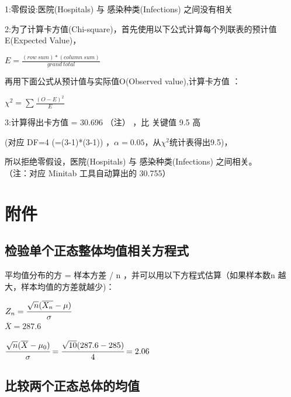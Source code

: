 1:零假设:医院(Hospitals) 与 感染种类(Infections) 之间没有相关

2:为了计算卡方值(Chi-square)，首先使用以下公式计算每个列联表的预计值E(Expected
Value)，

\(E = \frac{(row \ sum) * (column \ sum)} {grand \ total}\)

再用下面公式从预计值与实际值O(Observed value),计算卡方值 ：

\(\chi ^2 = \sum \frac{(O - E)^2} {E}\)

3:计算得出卡方值 = 30.696 （注） ，比 关键值 9.5 高

\begin{description}
\tightlist
\item[]
(对应 DF=4 (=(3-1)*(3-1))
，\(\alpha = 0.05\)，从\(\chi ^2\)统计表得出9.5)，\\
\end{description}

所以拒绝零假设，医院(Hospitals) 与 感染种类(Infections) 之间相关。\\

（注：对应 Minitab 工具自动算出的 30.755）\\

\hypertarget{ux9644ux4ef6}{%
\section{附件}\label{ux9644ux4ef6}}

\hypertarget{ux68c0ux9a8cux5355ux4e2aux6b63ux6001ux6574ux4f53ux5747ux503cux76f8ux5173ux65b9ux7a0bux5f0f}{%
\subsection{检验单个正态整体均值相关方程式}\label{ux68c0ux9a8cux5355ux4e2aux6b63ux6001ux6574ux4f53ux5747ux503cux76f8ux5173ux65b9ux7a0bux5f0f}}

平均值分布的方 = 样本方差 / n ，并可以用以下方程式估算（如果样本数n
越大，样本均值的方差就越少)：

\(Z_n = \cfrac{ \sqrt{n}(\overline{X_n} - \mu) }{\sigma}\)\\

\(\overline{X} = 287.6\)

\(\cfrac{ \sqrt{n}(\overline{X} - \mu_0) }{\sigma} = \cfrac{ \sqrt{10}( 287.6 - 285 ) }{4} = 2.06\)\\

\hypertarget{ux6bd4ux8f83ux4e24ux4e2aux6b63ux6001ux603bux4f53ux7684ux5747ux503c-1}{%
\subsection{比较两个正态总体的均值}\label{ux6bd4ux8f83ux4e24ux4e2aux6b63ux6001ux603bux4f53ux7684ux5747ux503c-1}}

